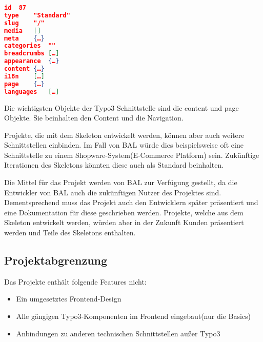 \begin{lstlisting}[language=json,firstnumber=1]
id	87
type	"Standard"
slug	"/"
media	[]
meta	{…}
categories	""
breadcrumbs	[…]
appearance	{…}
content	{…}
i18n	[…]
page	{…}
languages	[…]
\end{lstlisting}
Die wichtigsten Objekte der Typo3 Schnittstelle sind die content und page Objekte. Sie beinhalten den Content und die Navigation.

Projekte, die mit dem Skeleton entwickelt werden, können aber auch weitere Schnittstellen einbinden. Im Fall von \acs{BAL} würde dies beispielsweise oft eine Schnittstelle zu einem Shopware-System(E-Commerce Platform) sein. Zukünftige Iterationen des Skeletons könnten diese auch als Standard beinhalten.

Die Mittel für das Projekt werden von  \acs{BAL} zur Verfügung gestellt, da die Entwickler von \acs{BAL} auch die zukünftigen Nutzer des Projektes sind. Dementsprechend muss das Projekt auch den Entwicklern später präsentiert und eine Dokumentation für diese geschrieben werden. Projekte, welche aus dem Skeleton entwickelt werden, würden aber in der Zukunft Kunden präsentiert werden und Teile des Skeletons enthalten.


\subsection{Projektabgrenzung} 
\label{sec:Projektabgrenzung}

Das Projekte enthält folgende Features nicht:

\begin{itemize}
	\item Ein umgesetztes Frontend-Design
	\item Alle gängigen Typo3-Komponenten im Frontend eingebaut(nur die Basics)
	\item Anbindungen zu anderen technischen Schnittstellen außer Typo3
\end{itemize}
